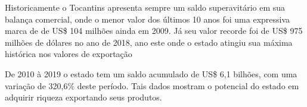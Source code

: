 \par Historicamente o Tocantins apresenta sempre um saldo superavitário em sua balança comercial, onde o menor valor dos últimos 10 anos foi uma expressiva marca de de US\$ 104 milhões ainda em 2009. Já seu valor recorde foi de US\$ 975 milhões de dólares no ano de 2018, ano este onde o estado atingiu sua máxima histórica nos valores de exportação

De 2010 à 2019 o estado tem um saldo acumulado de US\$ 6,1 bilhões, com uma variação de 320,6\% deste período. Tais dados mostram o potencial do estado em adquirir riqueza exportando seus produtos. 
